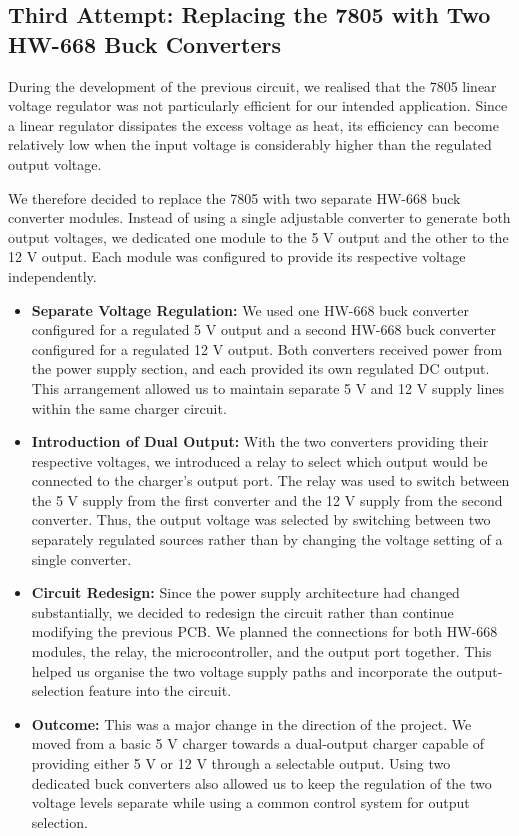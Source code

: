 \documentclass[12pt,a4paper]{article}
\numberwithin{figure}{section}
\begin{document}
\subsection{Third Attempt: Replacing the 7805 with Two HW-668 Buck Converters}

During the development of the previous circuit, we realised that the 7805 linear voltage regulator was not particularly efficient for our intended application. Since a linear regulator dissipates the excess voltage as heat, its efficiency can become relatively low when the input voltage is considerably higher than the regulated output voltage.

We therefore decided to replace the 7805 with two separate HW-668 buck converter modules. Instead of using a single adjustable converter to generate both output voltages, we dedicated one module to the 5 V output and the other to the 12 V output. Each module was configured to provide its respective voltage independently.

\begin{itemize}

    \item \textbf{Separate Voltage Regulation:}
    We used one HW-668 buck converter configured for a regulated 5 V output and a second HW-668 buck converter configured for a regulated 12 V output. Both converters received power from the power supply section, and each provided its own regulated DC output. This arrangement allowed us to maintain separate 5 V and 12 V supply lines within the same charger circuit.

    \item \textbf{Introduction of Dual Output:}
    With the two converters providing their respective voltages, we introduced a relay to select which output would be connected to the charger's output port. The relay was used to switch between the 5 V supply from the first converter and the 12 V supply from the second converter. Thus, the output voltage was selected by switching between two separately regulated sources rather than by changing the voltage setting of a single converter.

    \item \textbf{Circuit Redesign:}
    Since the power supply architecture had changed substantially, we decided to redesign the circuit rather than continue modifying the previous PCB. We planned the connections for both HW-668 modules, the relay, the microcontroller, and the output port together. This helped us organise the two voltage supply paths and incorporate the output-selection feature into the circuit.

    \item \textbf{Outcome:}
    This was a major change in the direction of the project. We moved from a basic 5 V charger towards a dual-output charger capable of providing either 5 V or 12 V through a selectable output. Using two dedicated buck converters also allowed us to keep the regulation of the two voltage levels separate while using a common control system for output selection.

\end{itemize}
\end{document}
